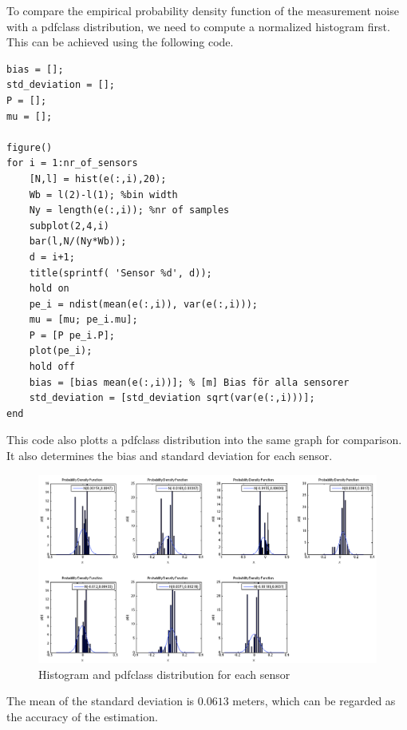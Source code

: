 \documentclass[10pt,a4paper]{report}
\begin{document}
To compare the empirical probability density function of the measurement noise with a pdfclass distribution, we need to compute a normalized histogram first. This can be achieved using the following code.
\begin{verbatim}
bias = [];
std_deviation = [];
P = [];
mu = [];

figure()
for i = 1:nr_of_sensors
    [N,l] = hist(e(:,i),20);
    Wb = l(2)-l(1); %bin width
    Ny = length(e(:,i)); %nr of samples
    subplot(2,4,i)
    bar(l,N/(Ny*Wb));
    d = i+1;
    title(sprintf( 'Sensor %d', d));
    hold on
    pe_i = ndist(mean(e(:,i)), var(e(:,i)));
    mu = [mu; pe_i.mu];
    P = [P pe_i.P];
    plot(pe_i);
    hold off
    bias = [bias mean(e(:,i))]; % [m] Bias för alla sensorer
    std_deviation = [std_deviation sqrt(var(e(:,i)))];
end
\end{verbatim}
This code also plotts a pdfclass distribution into the same graph for comparison. It also determines the bias and standard deviation for each sensor. 
\begin{figure}[H]
  \includegraphics[width = 400pt]{histogram.png}
  \caption{Histogram and pdfclass distribution for each sensor}
  \label{histogram}
\end{figure}
The mean of the standard deviation is $0.0613$ meters, which can be regarded as the accuracy of the estimation.



\newpage
\end{document}
